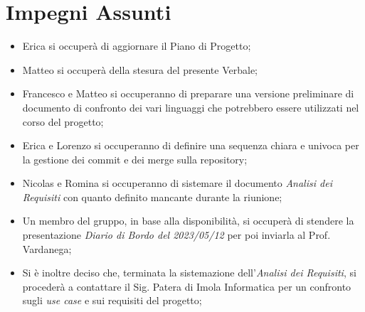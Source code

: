 \documentclass[a4paper, 12pt]{article}
\begin{document}
\section*{Impegni Assunti}
\begin{itemize}
    \item Erica si occuperà di aggiornare il Piano di Progetto;
    \item Matteo si occuperà della stesura del presente Verbale;
    \item Francesco e Matteo si occuperanno di preparare una versione preliminare di documento di confronto dei vari linguaggi che potrebbero essere utilizzati nel corso del progetto;
    \item Erica e Lorenzo si occuperanno di definire una sequenza chiara e univoca per la gestione dei commit e dei merge sulla repository;
    \item Nicolas e Romina si occuperanno di sistemare il documento \textit{Analisi dei Requisiti} con quanto definito mancante durante la riunione;
    \item Un membro del gruppo, in base alla disponibilità, si occuperà di stendere la presentazione \textit{Diario di Bordo del 2023/05/12} per poi inviarla al Prof. Vardanega;
    \item Si è inoltre deciso che, terminata la sistemazione dell'\textit{Analisi dei Requisiti}, si procederà a contattare il Sig. Patera di Imola Informatica per un confronto sugli \textit{use case} e sui requisiti del progetto;
\end{itemize}
\end{document}
